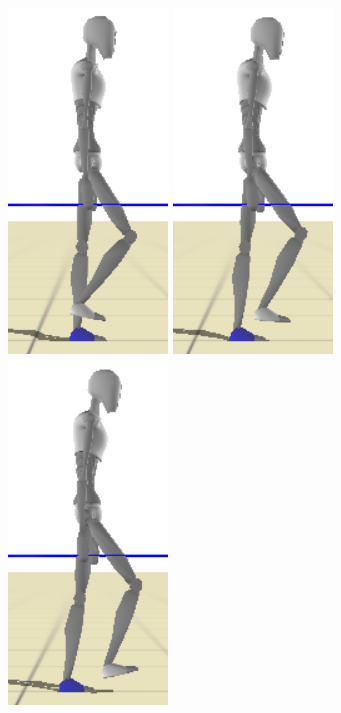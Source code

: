 \documentclass[conference]{acmsiggraph}
\begin{document}
\begin{figure}[t]
\includegraphics[scale=0.17]{images/strips/0_75/4.png}
\includegraphics[scale=0.17]{images/strips/0_75/5.png}
\includegraphics[scale=0.17]{images/strips/0_75/6.png}

\end{figure}
\end{document}
